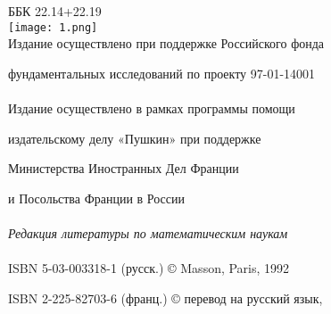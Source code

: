 \hspace{4.0in} ББК 22.14+22.19
\\

\hspace{2.4in} \texttt{[image: 1.png]}
\\

\hspace{2.0cm} Издание осуществлено при поддержке Российского фонда 

\hspace{2.3cm}фундаментальных исследований по проекту 97-01-14001
\\\\

\hspace{2.5cm} Издание осуществлено в рамках программы помощи 

\hspace{2.9cm} издательскому делу «Пушкин» при поддержке 

\hspace{3.2cm} Министерства Иностранных Дел Франции

\hspace{4.0cm} и Посольства Франции в России
\\\\
 
\hspace{2.0cm} \textit {Редакция литературы по математическим наукам}
\\\\

ISBN 5-03-003318-1 (русск.) \hspace{2.1cm} © Masson, Paris, 1992 

 ISBN 2-225-82703-6 (франц.) \hspace{2.0cm} © перевод на русский язык,
 
